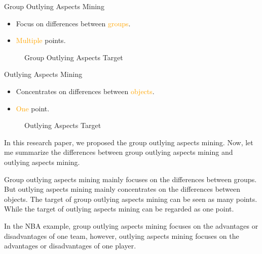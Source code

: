 \documentclass[
size=14pt,
paper=smartboard,  %
mode=present, 		%
display=slides, 	%
style=tuliplab,  	%
pauseslide,
fleqn,leqno]{powerdot}
\begin{document}
	
	\begin{slide}[toc=,bm=]{}
		\twocolumn
		{
			Group Outlying Aspects Mining
			\begin{itemize}
				\item
				\smallskip
				Focus on differences between \textcolor{orange}{groups}.
				
				\item
				\smallskip
				\textcolor{orange}{Multiple} points.
				\medskip
			\end{itemize}
			\vspace{0.75cm}
			\begin{figure}
				\centering
				\caption{Group Outlying Aspects Target}\label{fig:GroupOutAspect-target}
			\end{figure}
		}
		{
			Outlying Aspects Mining
			\begin{itemize}
				\item
				Concentrates on differences between \textcolor{orange}{objects}.
				
				\item
				\textcolor{orange}{One} point.
			\end{itemize}
			\bigskip
			\begin{figure}
				\centering
				\caption{Outlying Aspects Target}\label{fig:OutAspect-target}
			\end{figure}
		}
		
		\begin{note}
			In this research paper,
			we proposed the group outlying aspects mining.
			Now,
			let me summarize the differences between group outlying aspects mining and outlying aspects mining.
			
			Group outlying aspects mining mainly focuses on the differences between groups.
			But outlying aspects mining mainly concentrates on the differences between objects.
			The target of group outlying aspects mining can be seen as many points.
			While the target of outlying aspects mining can be regarded as one point.
			
			In the NBA example,
			group outlying aspects mining focuses on the advantages
			or disadvantages of one team,
			however,
			outlying aspects mining focuses on the advantages or disadvantages of one player.
		\end{note}
		
	\end{slide}
	
\end{document}
